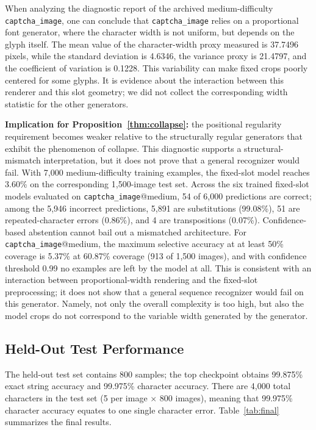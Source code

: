 \documentclass[pdflatex,sn-mathphys-num,iicol]{sn-jnl}
\begin{document}
When analyzing the diagnostic report of the archived medium-difficulty
\texttt{captcha\_image}, one can conclude that \texttt{captcha\_image} relies
on a proportional font generator, where the character width is not uniform,
but depends on the glyph itself. The mean value of the character-width proxy
measured is 37.7496 pixels, while the standard deviation is 4.6346, the
variance proxy is 21.4797, and the coefficient of variation is 0.1228.
This variability can make fixed crops poorly centered for some glyphs. It is
evidence about the interaction between this renderer and this slot geometry;
we did not collect the corresponding width statistic for the other generators.

\textbf{Implication for Proposition~\ref{thm:collapse}:} the positional regularity requirement becomes weaker relative to the structurally regular generators that exhibit the phenomenon of collapse. This diagnostic supports a structural-mismatch interpretation, but it does not
prove that a general recognizer would fail. With 7,000 medium-difficulty
training examples, the fixed-slot model reaches 3.60\% on the corresponding
1,500-image test set. Across the six trained fixed-slot models evaluated on
\texttt{captcha\_image}@medium, 54 of 6,000 predictions are correct; among the
5,946 incorrect predictions, 5,891 are substitutions (99.08\%), 51 are
repeated-character errors (0.86\%), and 4 are transpositions (0.07\%). Confidence-based abstention cannot bail out a mismatched architecture. For \texttt{captcha\_image}@medium, the maximum selective accuracy at at
least 50\% coverage is 5.37\% at 60.87\% coverage (913 of 1,500 images), and with confidence threshold 0.99 no examples are left by the model at all. This is consistent with an interaction between proportional-width rendering and the fixed-slot preprocessing; it does not show that a general sequence recognizer would fail on this generator.
Namely, not only the overall complexity is too high,
but also the model crops do not correspond to the variable width generated by the generator.

\subsection{Held-Out Test Performance}

The held-out test set contains 800 samples; the top checkpoint obtains 99.875\% exact string accuracy and 99.975\% character accuracy. There are 4{,}000 total characters in the test set (5 per image $\times$ 800 images), meaning that 99.975\% character accuracy equates to one single character error. Table~\ref{tab:final} summarizes the final results.
\end{document}
